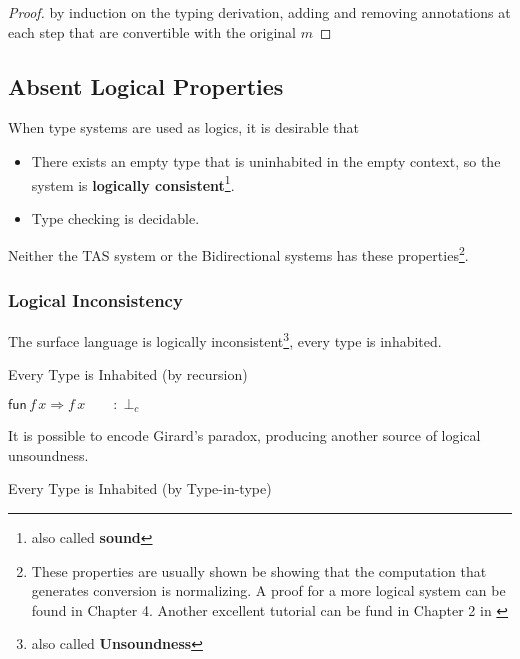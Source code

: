 \begin{proof}
by induction on the typing derivation, adding and removing annotations at each step that are convertible with the original $m$
\end{proof}

\subsection{Absent Logical Properties}

When type systems are used as logics, it is desirable that
\begin{itemize}
\item There exists an empty type that is uninhabited in the empty context, so the system is \textbf{logically consistent}\footnote{also called \textbf{sound}}.
\item Type checking is decidable.
\end{itemize}
Neither the TAS system or the Bidirectional systems has these properties\footnote{These properties are usually shown be showing that the computation that generates conversion is normalizing.
A proof for a more logical system can be found in Chapter 4\cite{luo1994computation}.
Another excellent tutorial can be fund in Chapter 2 in \cite{casinghino2014combiningthesis}}.

\subsubsection{Logical Inconsistency}

The surface language is logically inconsistent\footnote{also called \textbf{Unsoundness}}, every type is inhabited.



\begin{example}
Every Type is Inhabited (by recursion)

$\mathsf{fun}\,f\,x\Rightarrow f\,x\qquad:\perp_{c}$
\end{example}

It is possible to encode Girard's paradox, producing another source of logical unsoundness.
\begin{example}
Every Type is Inhabited (by Type-in-type)


\end{example}

